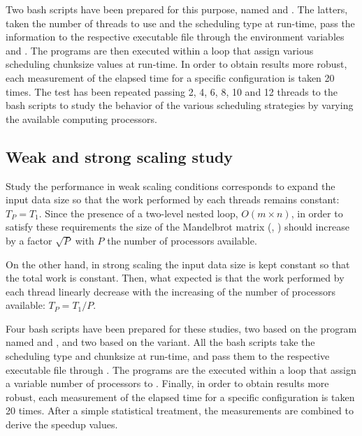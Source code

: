 Two bash scripts have been prepared for this purpose, named  and . The latters, taken the number of threads to use and the scheduling type at run-time, pass the information to the respective executable file through the environment variables  and . The programs are then executed within a loop that assign various scheduling chunksize values at run-time. In order to obtain results more robust, each measurement of the elapsed time for a specific configuration is taken 20 times. The test has been repeated passing 2, 4, 6, 8, 10 and 12 threads to the bash scripts to study the behavior of the various scheduling strategies by varying the available computing processors.

\subsection{Weak and strong scaling study}\label{sec:method-scale}
Study the performance in weak scaling conditions corresponds to expand the input data size so that the work performed by each threads remains constant: $T_P = T_1$. Since the presence of a two-level nested loop, $O(m \times n)$, in order to satisfy these requirements the size of the Mandelbrot matrix (, ) should increase by a factor $\sqrt{P}$ with $P$ the number of processors available.

On the other hand, in strong scaling the input data size is kept constant so that the total work is constant. Then, what expected is that the work performed by each thread linearly decrease with the increasing of the number of processors available: $T_P = T_1 / P$.

Four bash scripts have been prepared for these studies, two based on the  program named  and , and two based on the  variant. All the bash scripts take the scheduling type and chunksize at run-time, and pass them to the respective executable file through . The programs are the executed within a loop that assign a variable number of processors to . Finally, in order to obtain results more robust, each measurement of the elapsed time for a specific configuration is taken 20 times. After a simple statistical treatment, the measurements are combined to derive the speedup values.